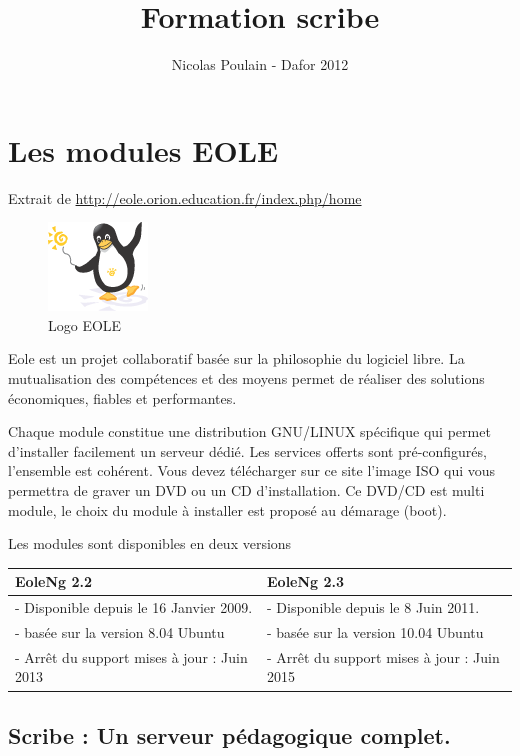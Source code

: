 \documentclass{article}
\title{Formation scribe}
\author{Nicolas Poulain - Dafor 2012}
\makeatletter
\def\maxwidth{\ifdim\Gin@nat@width>\linewidth\linewidth
\else\Gin@nat@width\fi}
\let\Oldincludegraphics\includegraphics
\renewcommand{\includegraphics}[1]{\Oldincludegraphics[width=\maxwidth]{#1}}
\makeatother
\begin{document}
\maketitle

\tableofcontents

\section{Les modules EOLE}

Extrait de \url{http://eole.orion.education.fr/index.php/home}

\begin{figure}[htbp]
\centering
\includegraphics{scribe_html_2ce1ff75.png}
\caption{Logo EOLE}
\end{figure}

Eole est un projet collaboratif basée sur la philosophie du logiciel
libre. La mutualisation des compétences et des moyens permet de réaliser
des solutions économiques, fiables et performantes.

Chaque module constitue une distribution GNU/LINUX spécifique qui permet
d'installer facilement un serveur dédié. Les services offerts sont
pré-configurés, l'ensemble est cohérent. Vous devez télécharger sur ce
site l'image ISO qui vous permettra de graver un DVD ou un CD
d'installation. Ce DVD/CD est multi module, le choix du module à
installer est proposé au démarage (boot).

Les modules sont disponibles en deux versions

\begin{center}
\begin{tabular}{ll}
EoleNg 2.2 & EoleNg 2.3\\
\hline
- Disponible depuis le 16 Janvier 2009. & - Disponible depuis le 8 Juin
2011.\\
- basée sur la version 8.04 Ubuntu & - basée sur la version 10.04
Ubuntu\\
- Arrêt du support mises à jour : Juin 2013 & - Arrêt du support mises à
jour : Juin 2015\\
\end{tabular}
\end{center}

\subsection{Scribe : Un serveur pédagogique complet.}
\end{document}
